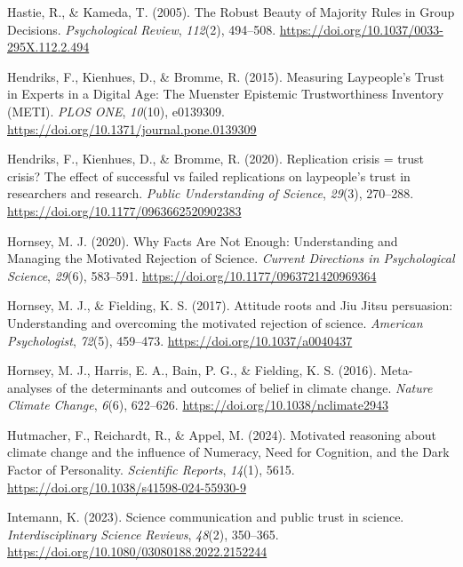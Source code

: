 \documentclass[
  jou,
  floatsintext,
  longtable,
  nolmodern,
  notxfonts,
  notimes,
  colorlinks=true,linkcolor=blue,citecolor=blue,urlcolor=blue]{apa7}
\newlength{\cslhangindent}
\newenvironment{CSLReferences}[2] %
 {\begin{list}{}{%
  \setlength{\itemindent}{0pt}
  \setlength{\leftmargin}{0pt}
  \setlength{\parsep}{0pt}
  \ifodd #1
   \setlength{\leftmargin}{\cslhangindent}
   \setlength{\itemindent}{-1\cslhangindent}
  \fi
  \setlength{\itemsep}{#2\baselineskip}}}
 {\end{list}}
\begin{document}
\begin{CSLReferences}{1}{0}
Hastie, R., \& Kameda, T. (2005). The Robust Beauty of Majority Rules in
Group Decisions. \emph{Psychological Review}, \emph{112}(2), 494--508.
\url{https://doi.org/10.1037/0033-295X.112.2.494}

Hendriks, F., Kienhues, D., \& Bromme, R. (2015). Measuring
Laypeople{'}s Trust in Experts in a Digital Age: The Muenster Epistemic
Trustworthiness Inventory (METI). \emph{PLOS ONE}, \emph{10}(10),
e0139309. \url{https://doi.org/10.1371/journal.pone.0139309}

Hendriks, F., Kienhues, D., \& Bromme, R. (2020). Replication crisis =
trust crisis? The effect of successful vs failed replications on
laypeople{'}s trust in researchers and research. \emph{Public
Understanding of Science}, \emph{29}(3), 270--288.
\url{https://doi.org/10.1177/0963662520902383}

Hornsey, M. J. (2020). Why Facts Are Not Enough: Understanding and
Managing the Motivated Rejection of Science. \emph{Current Directions in
Psychological Science}, \emph{29}(6), 583--591.
\url{https://doi.org/10.1177/0963721420969364}

Hornsey, M. J., \& Fielding, K. S. (2017). Attitude roots and Jiu Jitsu
persuasion: Understanding and overcoming the motivated rejection of
science. \emph{American Psychologist}, \emph{72}(5), 459--473.
\url{https://doi.org/10.1037/a0040437}

Hornsey, M. J., Harris, E. A., Bain, P. G., \& Fielding, K. S. (2016).
Meta-analyses of the determinants and outcomes of belief in climate
change. \emph{Nature Climate Change}, \emph{6}(6), 622--626.
\url{https://doi.org/10.1038/nclimate2943}

Hutmacher, F., Reichardt, R., \& Appel, M. (2024). Motivated reasoning
about climate change and the influence of Numeracy, Need for Cognition,
and the Dark Factor of Personality. \emph{Scientific Reports},
\emph{14}(1), 5615. \url{https://doi.org/10.1038/s41598-024-55930-9}

Intemann, K. (2023). Science communication and public trust in science.
\emph{Interdisciplinary Science Reviews}, \emph{48}(2), 350--365.
\url{https://doi.org/10.1080/03080188.2022.2152244}


\end{CSLReferences}
\end{document}
